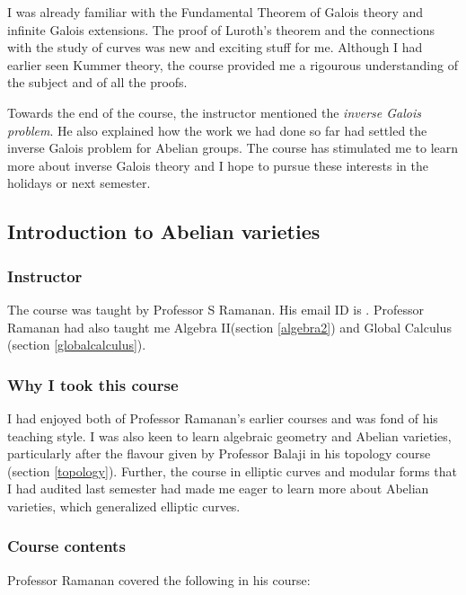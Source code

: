 \documentclass[a4paper]{amsart}
\begin{document}
I was already familiar with the Fundamental Theorem of Galois theory
and infinite Galois extensions. The proof of Luroth's theorem and the
connections with the study of curves was new and exciting stuff for
me. Although I had earlier seen Kummer theory, the course provided me a rigourous
understanding of the subject and of all the proofs.

Towards the end of the course, the instructor mentioned the {\em inverse Galois problem}.
He also explained how the work we had done so far had settled the inverse Galois problem for Abelian groups.
The course has stimulated me to learn more about inverse Galois theory
and I hope to pursue these interests in the holidays or next semester.

\subsection{Introduction to Abelian varieties}

\subsubsection{Instructor}

The course was taught by Professor S Ramanan. His email ID is . Professor Ramanan had also
taught me Algebra II(section \ref{algebra2}) and Global Calculus (section \ref{globalcalculus}).

\subsubsection{Why I took this course}

I had enjoyed both of Professor Ramanan's earlier courses and was fond of his teaching style.
I was also keen to learn algebraic geometry and Abelian varieties, particularly after the flavour
given by Professor Balaji in his topology course (section \ref{topology}). Further, the course in elliptic curves
and modular forms that I had audited last semester had made me eager to learn more about Abelian varieties,
which generalized elliptic curves.

\subsubsection{Course contents}

Professor Ramanan covered the following in his course:
\end{document}
